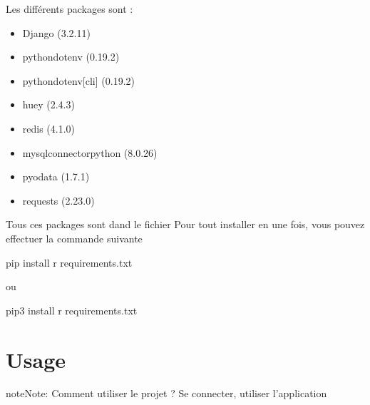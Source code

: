 \documentclass[letterpaper,10pt,english]{sphinxmanual}
\begin{document}
\sphinxAtStartPar
Les différents packages sont :
\begin{itemize}
\item {} 
\sphinxAtStartPar
Django (3.2.11)

\item {} 
\sphinxAtStartPar
python\sphinxhyphen{}dotenv (0.19.2)

\item {} 
\sphinxAtStartPar
python\sphinxhyphen{}dotenv{[}cli{]} (0.19.2)

\item {} 
\sphinxAtStartPar
huey (2.4.3)

\item {} 
\sphinxAtStartPar
redis (4.1.0)

\item {} 
\sphinxAtStartPar
mysql\sphinxhyphen{}connector\sphinxhyphen{}python (8.0.26)

\item {} 
\sphinxAtStartPar
pyodata (1.7.1)

\item {} 
\sphinxAtStartPar
requests (2.23.0)

\end{itemize}

\sphinxAtStartPar
Tous ces packages sont dand le fichier 
Pour tout installer en une fois, vous pouvez effectuer la commande suivante

\begin{sphinxVerbatim}[commandchars=\\\{\}]
 pip install \PYGZhy{}r requirements.txt
\end{sphinxVerbatim}

\sphinxAtStartPar
ou

\begin{sphinxVerbatim}[commandchars=\\\{\}]
 pip3 install \PYGZhy{}r requirements.txt
\end{sphinxVerbatim}

\sphinxstepscope


\section{Usage}
\label{\detokenize{Usage:usage}}\label{\detokenize{Usage::doc}}
\begin{sphinxadmonition}{note}{Note:}
\sphinxAtStartPar
Comment utiliser le projet ? Se connecter, utiliser l’application
\end{sphinxadmonition}
\end{document}
